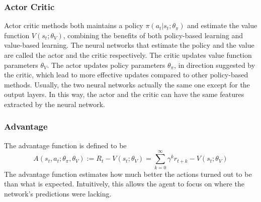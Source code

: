         \subsubsection{Actor Critic}

            Actor critic methods both maintains a policy $\pi(a_t|s_t;\theta_{\pi})$ and 
            estimate the value function $V(s_t;\theta_V)$,
            combining the benefits of both policy-based learning and value-based learning.
            The neural networks that estimate the policy and the value are called the actor and the critic respectively.
            The critic updates value function parameters $\theta_V$.
            The actor updates policy parameters $\theta_{\pi}$, in direction suggested by the critic,
            which lead to more effective updates compared to other policy-based methods. 
            Usually, the two neural networks actually the same one except for the output layers.
            In this way, the actor and the critic can have the same features extracted by the neural network.

        \subsubsection{Advantage}

            The advantage function is defined to be
            \[
            A(s_t,a_t;\theta_{\pi},\theta_V) := R_t - V(s_t;\theta_V)
            = \sum_{k=0}^{\infty} \gamma^k r_{t+k} - V(s_t;\theta_V)
            \]
            The advantage function estimates how much better the actions turned out to be than what is expected.
            Intuitively, this allows the agent to focus on where the network's predictions were lacking.



















